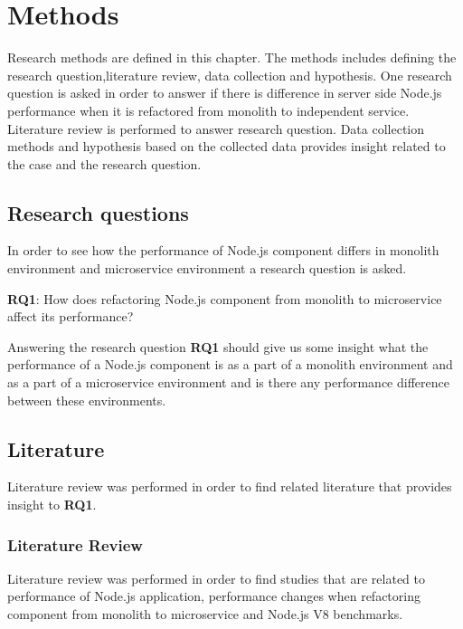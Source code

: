 \chapter{Methods\label{methods}}
Research methods are defined in this chapter.
The methods includes defining the research question,literature review, data collection and hypothesis.
One research question is asked in order to answer if there is difference in server side Node.js performance when it is refactored from monolith to independent service.
Literature review is performed to answer research question.
Data collection methods and hypothesis based on the collected data provides insight related to the case and the research question.


\section{Research questions}
In order to see how the performance of Node.js component differs in monolith environment and microservice environment a research question is asked.

\textbf{RQ1}: How does refactoring Node.js component from monolith to microservice affect its performance?

Answering the research question \textbf{RQ1} should give us some insight what the performance of a Node.js component is as a part of a monolith environment and as a part of a microservice environment and is there any performance difference between these environments.


\section{Literature}
Literature review was performed in order to find related literature that provides insight to \textbf{RQ1}.

\subsection{Literature Review}
Literature review was performed in order to find studies that are related to performance of Node.js application, performance changes when refactoring component from monolith to microservice and Node.js V8 benchmarks.

